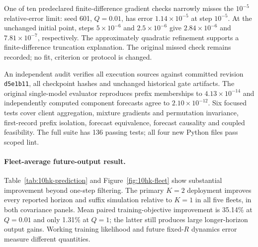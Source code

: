 One of ten predeclared finite-difference gradient checks narrowly misses the
$10^{-5}$ relative-error limit: seed 601, $Q=0.01$, has error
$1.14\times10^{-5}$ at step $10^{-5}$. At the unchanged initial point, steps
$5\times10^{-6}$ and $2.5\times10^{-6}$ give $2.84\times10^{-6}$ and
$7.81\times10^{-7}$, respectively. The approximately quadratic refinement
supports a finite-difference truncation explanation. The original missed
check remains recorded; no fit, criterion or protocol is changed.

An independent audit verifies all execution sources against committed
revision \texttt{d5e1b11}, all checkpoint hashes and unchanged historical gate
artifacts. The original single-model evaluator reproduces prefix memberships
to $4.13\times10^{-14}$ and independently computed component forecasts agree
to $2.10\times10^{-12}$. Six focused tests cover client aggregation, mixture
gradients and permutation invariance, first-record prefix isolation, forecast
equivalence, forecast causality and coupled feasibility. The full suite has
136 passing tests; all four new Python files pass scoped lint.

\paragraph{Fleet-average future-output result.}
Table~\ref{tab:10hk-prediction} and Figure~\ref{fig:10hk-fleet} show substantial
improvement beyond one-step filtering. The primary $K=2$ deployment improves
every reported horizon and suffix simulation relative to $K=1$ in all five
fleets, in both covariance panels. Mean paired training-objective improvement
is 35.14\% at $Q=0.01$ and only 1.31\% at $Q=1$; the latter still produces
large longer-horizon output gains. Working training likelihood and future
fixed-$R$ dynamics error measure different quantities.

